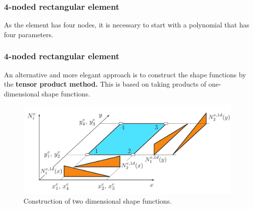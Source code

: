 \documentclass[notes]{beamer}
\begin{document}
\begin{frame}
\frametitle{4-noded rectangular element}
As the element has four nodes, it is necessary to start with a polynomial that has four
parameters.
\end{frame}


\begin{frame}
\frametitle{4-noded rectangular element}
An alternative and more elegant approach is to construct the shape functions by the \textbf{tensor
product method.} This is based on taking products of one-dimensional shape functions.

\begin{figure}[ht]
	\centering
	\includegraphics[width=\textwidth]{figs/4noded-quad-tensor-product.png}
	\caption*{Construction of two dimensional shape functions.}
\end{figure}

\end{frame}
\end{document}
